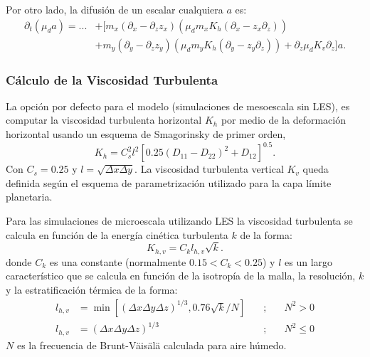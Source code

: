 Por otro lado, la difusión de un escalar cualquiera $a$ es:
\begin{equation}\begin{split}
\partial_t(\mu_d a) = ... &+ [m_x(\partial_x-\partial_z z_x)(\mu_d m_x K_h(\partial_x - z_x\partial_z)) \\
&+m_y(\partial_y-\partial_z z_y)(\mu_d m_y K_h(\partial_y-z_y\partial_z))+\partial_z\mu_dK_v\partial_z]a.
\end{split}\end{equation}

\subsubsection{Cálculo de la Viscosidad Turbulenta}
La opción por defecto para el modelo (simulaciones de mesoescala sin LES), es computar la viscosidad turbulenta horizontal $K_h$ por medio de la deformación horizontal usando un esquema de Smagorinsky de primer orden,
\begin{equation}
K_h = C_s^2 l^2[0.25(D_{11}-D_{22})^2+D_{12}]^{0.5}.
\end{equation}
Con $C_s=0.25$ y $l=\sqrt{\Delta x\Delta y}$. La viscosidad turbulenta vertical $K_v$ queda definida según el esquema de parametrización utilizado para la capa límite planetaria.

Para las simulaciones de microescala utilizando LES la viscosidad turbulenta se calcula en función de la energía cinética turbulenta $k$ de la forma:
\begin{equation}
K_{h,v}=C_k l_{h,v}\sqrt{k}.
\end{equation}
donde $C_k$ es una constante (normalmente $0.15<C_k<0.25$) y $l$ es un largo característico que se calcula en función de la isotropía de la malla, la resolución, $k$ y la estratificación térmica de la forma:
\begin{align}
	l_{h,v} &= \min[(\Delta x \Delta y \Delta z)^{1/3}, 0.76\sqrt{k}/N]\quad&;&\quad N^2>0\\
	l_{h,v} &= (\Delta x \Delta y \Delta z)^{1/3}\quad&;&\quad N^2\leq 0 
\end{align}
$N$ es la frecuencia de Brunt-Väisälä calculada para aire húmedo.

